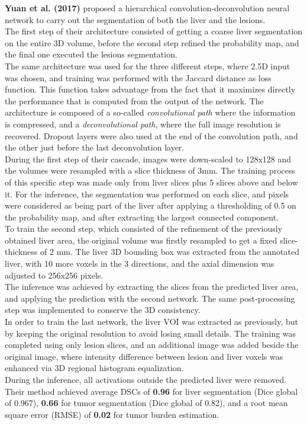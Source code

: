 \textbf{Yuan et al. (2017)} proposed a hierarchical
convolution-deconvolution neural network to carry out the segmentation
of both the liver and the lesions.\\
The first step of their architecture consisted of getting a coarse liver
segmentation on the entire 3D volume, before the second step refined the
probability map, and the final one executed the lesions segmentation.\\
The same architecture was used for the three different steps, where 2.5D
input was chosen, and training was performed with the Jaccard distance
as loss function. This function takes advantage from the fact that it
maximizes directly the performance that is computed from the output of
the network. The architecture is composed of a so-called
\emph{convolutional path} where the information is compressed, and a
\emph{deconvolutional path}, where the full image resolution is
recovered. Dropout layers were also used at the end of the convolution
path, and the other just before the last deconvolution layer.\\
During the first step of their cascade, images were down-scaled to
128x128 and the volumes were resampled with a slice thickness of 3mm.
The training process of this specific step was made only from liver
slices plus 5 slices above and below it. For the inference, the
segmentation was performed on each slice, and pixels were considered as
being part of the liver after applying a thresholding of 0.5 on the
probability map, and after extracting the largest connected component.\\
To train the second step, which consisted of the refinement of the
previously obtained liver area, the original volume was firstly
resampled to get a fixed slice-thickness of 2 mm. The liver 3D bounding
box was extracted from the annotated liver, with 10 more voxels in the 3
directions, and the axial dimension was adjusted to 256x256 pixels.\\
The inference was achieved by extracting the slices from the predicted
liver area, and applying the prediction with the second network. The
same post-processing step was implemented to conserve the 3D
consistency.\\
In order to train the last network, the liver VOI was extracted as
previously, but by keeping the original resolution to avoid losing small
details. The training was completed using only lesion slices, and an
additional image was added beside the original image, where intensity
difference between lesion and liver voxels was enhanced via 3D regional
histogram equalization.\\
During the inference, all activations outside the predicted liver were
removed.\\
Their method achieved average DSCs of \textbf{0.96} for liver
segmentation (Dice global of 0.967), \textbf{0.66} for tumor
segmentation (Dice global of 0.82), and a root mean square error (RMSE)
of \textbf{0.02} for tumor burden estimation.


